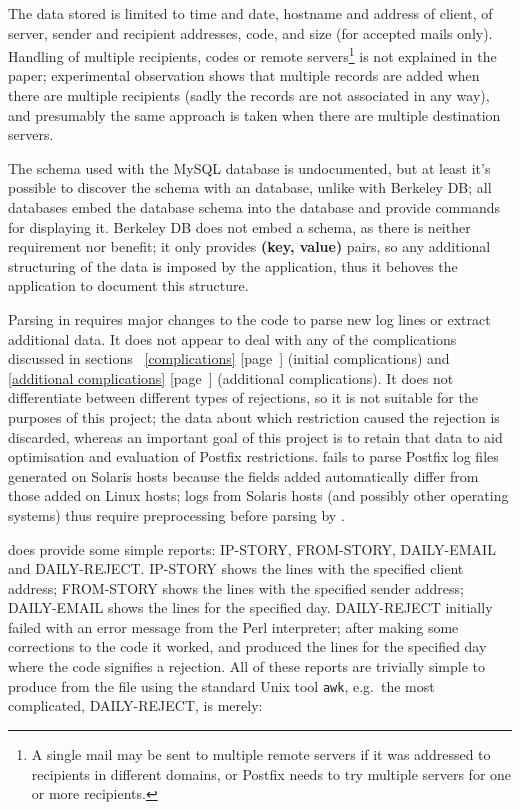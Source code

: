 \documentclass[a4paper,12pt,draft]{article}
\newcommand{\refwithpage}[1]{%
    \empty{}\ref{#1} [page~\pageref{#1}]%
}
\begin{document}
The data stored is limited to time and date, hostname and \IP{} address of
client, \IP{} of server, sender and recipient addresses, \SMTP{} code, and
size (for accepted mails only).  Handling of multiple recipients, \SMTP{}
codes or remote servers\footnote{A single mail may be sent to multiple
remote servers if it was addressed to recipients in different domains, or
Postfix needs to try multiple servers for one or more recipients.} is not
explained in the paper; experimental observation shows that multiple
records are added when there are multiple recipients (sadly the records are
not associated in any way), and presumably the same approach is taken when
there are multiple destination servers.

The schema used with the MySQL database is undocumented, but at least it's
possible to discover the schema with an \SQL{} database, unlike with
Berkeley DB\@; all \SQL{} databases embed the database schema into the
database and provide commands for displaying it.  Berkeley DB does not
embed a schema, as there is neither requirement nor benefit; it only
provides \textbf{(key, value)} pairs, so any additional structuring of the
data is imposed by the application, thus it behoves the application to
document this structure.

Parsing in \LMA{} requires major changes to the code to parse new log lines
or extract additional data.  It does not appear to deal with any of the
complications discussed in sections~\refwithpage{complications} (initial
complications) and~\refwithpage{additional complications} (additional
complications).  It does not differentiate between different types of
rejections, so it is not suitable for the purposes of this project; the
data about which restriction caused the rejection is discarded, whereas an
important goal of this project is to retain that data to aid optimisation
and evaluation of Postfix restrictions.  \LMA{} fails to parse Postfix log
files generated on Solaris hosts because the fields added automatically
differ from those added on Linux hosts; logs from Solaris hosts (and
possibly other operating systems) thus require preprocessing before parsing
by \LMA{}.

\LMA{} does provide some simple reports: IP-STORY, FROM-STORY, DAILY-EMAIL
and DAILY-REJECT\@.  IP-STORY shows the \CSV{} lines with the specified
client \IP{} address; FROM-STORY shows the \CSV{} lines with the specified
sender address; DAILY-EMAIL shows the \CSV{} lines for the specified day.
DAILY-REJECT initially failed with an error message from the Perl
interpreter; after making some corrections to the code it worked, and
produced the \CSV{} lines for the specified day where the \SMTP{} code
signifies a rejection.  All of these reports are trivially simple to
produce from the \CSV{} file using the standard Unix tool \texttt{awk},
e.g.\ the most complicated, DAILY-REJECT, is merely:
\end{document}
